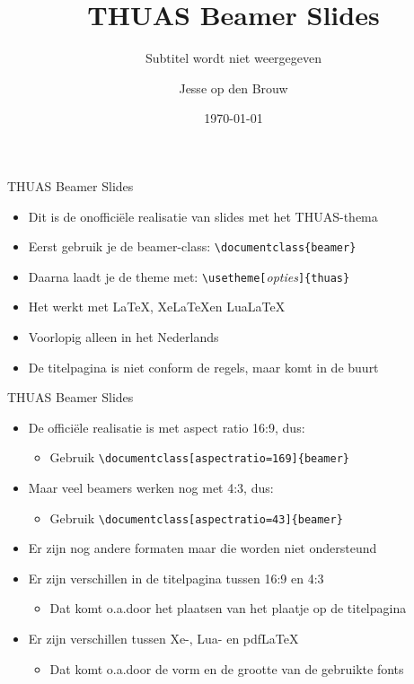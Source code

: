 \documentclass[fleqn,aspectratio=169,dutch]{beamer}
\title{THUAS Beamer Slides}
\subtitle{Subtitel wordt niet weergegeven}
\author{Jesse op den Brouw}
\date{\today}
\begin{document}
\maketitle

\begin{frame}[fragile]{THUAS Beamer Slides}
\begin{itemize}
\item Dit is de onofficiële realisatie van slides met het THUAS-thema
\item Eerst gebruik je de beamer-class: \lstinline|\documentclass{beamer}|
\item Daarna laadt je de theme met: \lstinline|\usetheme[|\emph{\small opties}\lstinline|]{thuas}|
\item Het werkt met \LaTeX, Xe\LaTeX en Lua\LaTeX
\item Voorlopig alleen in het Nederlands
\item De titelpagina is niet conform de regels, maar komt in de buurt
\end{itemize}
\end{frame}

\begin{frame}[fragile]{THUAS Beamer Slides}
\begin{itemize}
\item De officiële realisatie is met aspect ratio 16:9, dus:
\begin{itemize}
\item Gebruik \lstinline|\documentclass[aspectratio=169]{beamer}|
\end{itemize}
\item Maar veel beamers werken nog met 4:3, dus:
\begin{itemize}
\item Gebruik \lstinline|\documentclass[aspectratio=43]{beamer}|
\end{itemize}
\item Er zijn nog andere formaten maar die worden niet ondersteund
\item Er zijn verschillen in de titelpagina tussen 16:9 en 4:3
\begin{itemize}
\item Dat komt o.a.\@ door het plaatsen van het plaatje op de titelpagina
\end{itemize}
\item Er zijn verschillen tussen Xe-, Lua- en pdf\LaTeX
\begin{itemize}
\item Dat komt o.a.\@ door de vorm en de grootte van de gebruikte fonts
\end{itemize}
\end{itemize}
\end{frame}
\end{document}
